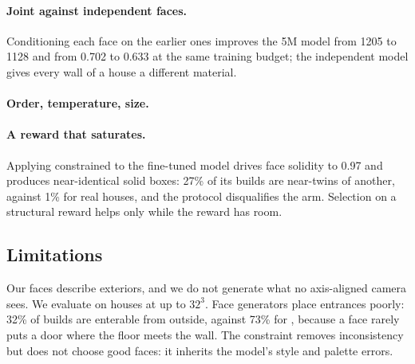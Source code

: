 \paragraph{Joint against independent faces.}
Conditioning each face on the earlier ones improves the 5M model from 1205 to 1128 \blockscore{} and
from 0.702 to 0.633 \mvkid{} at the same training budget; the independent model gives every wall of a
house a different material. 

\paragraph{Order, temperature, size.}
\paragraph{A reward that saturates.}
Applying constrained  to the fine-tuned model drives face solidity to 0.97 and produces
near-identical solid boxes: 27\% of its builds are near-twins of another, against 1\% for real
houses, and the protocol disqualifies the arm. Selection on a structural reward helps only while the
reward has room.

\subsection{Limitations}
\label{sec:limitations}

Our faces describe exteriors, and we do not generate what no axis-aligned camera sees. We evaluate on
houses at up to $32^3$. Face generators place entrances poorly: 32\% of \cfd{}  builds are
enterable from outside, against 73\% for \shellref{}, because a face rarely puts a door where the floor
meets the wall. 
The constraint removes inconsistency but does not choose good faces: it inherits the model's style and
palette errors.
